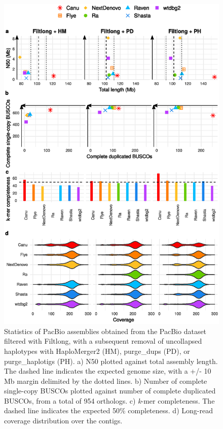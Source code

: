      \begin{figure}[ht]
    \centering
     \includegraphics[width=13.5cm]{fig/benchmark/supp_pacbio_filtlong_purging.eps}
   \caption{Statistics of PacBio assemblies obtained from the PacBio dataset filtered with Filtlong, with a subsequent removal of uncollapsed haplotypes with HaploMerger2 (HM), purge\_dups (PD), or purge\_haplotigs (PH). a) N50 plotted against total assembly length. The dashed line indicates the expected genome size, with a +/- 10 Mb margin delimited by the dotted lines. b) Number of complete single-copy BUSCOs plotted against number of complete duplicated BUSCOs, from a total of 954 orthologs. c) \textit{k}-mer completeness. The dashed line indicates the expected 50\% completeness. d) Long-read coverage distribution over the contigs.}
   \label{fig:pacbio_filtlong_purging}
 \end{figure}
 
